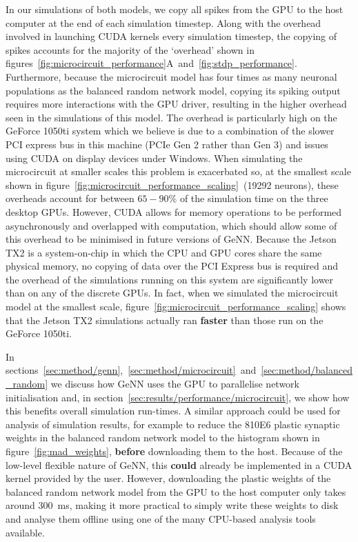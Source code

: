 \documentclass[utf8]{frontiersSCNS} %
\begin{document}
In our simulations of both models, we copy all spikes from the GPU to the host computer at the end of each simulation timestep.
Along with the overhead involved in launching CUDA kernels every simulation timestep, the copying of spikes accounts for the majority of the `overhead' shown in figures~\ref{fig:microcircuit_performance}A~and~\ref{fig:stdp_performance}.
Furthermore, because the microcircuit model has four times as many neuronal populations as the balanced random network model, copying its spiking output requires more interactions with the GPU driver, resulting in the higher overhead seen in the simulations of this model.
The overhead is particularly high on the GeForce 1050ti system which we believe is due to a combination of the slower PCI express bus in this machine (PCIe Gen 2 rather than Gen 3) and issues using CUDA on display devices under Windows.
When simulating the microcircuit at smaller scales this problem is exacerbated so, at the smallest scale shown in figure~\ref{fig:microcircuit_performance_scaling}~(\num{19292} neurons), these overheads account for between $65-90\si{\percent}$ of the simulation time on the three desktop GPUs.
However, CUDA allows for memory operations to be performed asynchronously and overlapped with computation, which should allow some of this overhead to be minimised in future versions of GeNN.
Because the Jetson TX2 is a system-on-chip in which the CPU and GPU cores share the same physical memory, no copying of data over the PCI Express bus is required and the overhead of the simulations running on this system are significantly lower than on any of the discrete GPUs.
In fact, when we simulated the microcircuit model at the smallest scale, figure~\ref{fig:microcircuit_performance_scaling} shows that the Jetson TX2 simulations actually ran \textbf{faster} than those run on the GeForce 1050ti.

In sections~\ref{sec:method/genn},~\ref{sec:method/microcircuit}~and~\ref{sec:method/balanced_random} we discuss how GeNN uses the GPU to parallelise network initialisation and, in section~\ref{sec:results/performance/microcircuit}, we show how this benefits overall simulation run-times.
A similar approach could be used for analysis of simulation results, for example to reduce the \num{810E6} plastic synaptic weights in the balanced random network model to the histogram shown in figure~\ref{fig:mad_weights}, \textbf{before} downloading them to the host.
Because of the low-level flexible nature of GeNN, this \textbf{could} already be implemented in a CUDA kernel provided by the user.
However, downloading the plastic weights of the balanced random network model from the GPU to the host computer only takes around \SI{300}{\milli\second}, making it more practical to simply write these weights to disk and analyse them offline using one of the many CPU-based analysis tools available.
\end{document}
